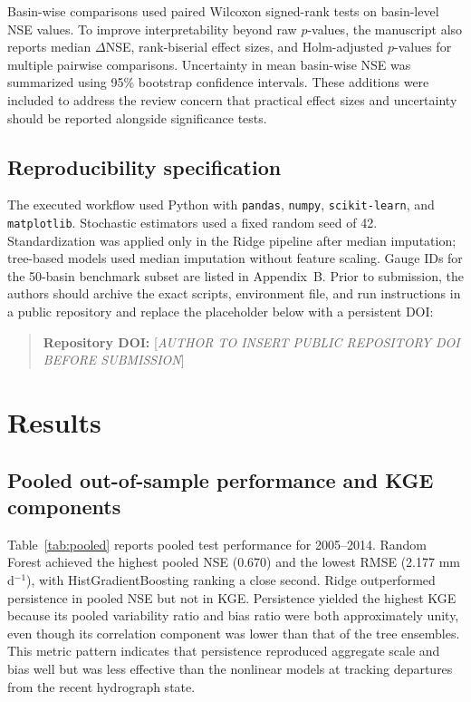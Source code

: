 \documentclass[preprint,12pt,authoryear]{elsarticle}
\begin{document}
Basin-wise comparisons used paired Wilcoxon signed-rank tests on basin-level NSE values. To improve interpretability beyond raw $p$-values, the manuscript also reports median $\Delta$NSE, rank-biserial effect sizes, and Holm-adjusted $p$-values for multiple pairwise comparisons. Uncertainty in mean basin-wise NSE was summarized using 95\% bootstrap confidence intervals. These additions were included to address the review concern that practical effect sizes and uncertainty should be reported alongside significance tests.

\subsection{Reproducibility specification}

The executed workflow used Python with \texttt{pandas}, \texttt{numpy}, \texttt{scikit-learn}, and \texttt{matplotlib}. Stochastic estimators used a fixed random seed of 42. Standardization was applied only in the Ridge pipeline after median imputation; tree-based models used median imputation without feature scaling. Gauge IDs for the 50-basin benchmark subset are listed in Appendix~B. Prior to submission, the authors should archive the exact scripts, environment file, and run instructions in a public repository and replace the placeholder below with a persistent DOI:

\begin{quote}
\textbf{Repository DOI:} [\textit{AUTHOR TO INSERT PUBLIC REPOSITORY DOI BEFORE SUBMISSION}]
\end{quote}

\section{Results}

\subsection{Pooled out-of-sample performance and KGE components}

Table~\ref{tab:pooled} reports pooled test performance for 2005--2014. Random Forest achieved the highest pooled NSE (0.670) and the lowest RMSE (2.177 mm d$^{-1}$), with HistGradientBoosting ranking a close second. Ridge outperformed persistence in pooled NSE but not in KGE. Persistence yielded the highest KGE because its pooled variability ratio and bias ratio were both approximately unity, even though its correlation component was lower than that of the tree ensembles. This metric pattern indicates that persistence reproduced aggregate scale and bias well but was less effective than the nonlinear models at tracking departures from the recent hydrograph state.
\end{document}

